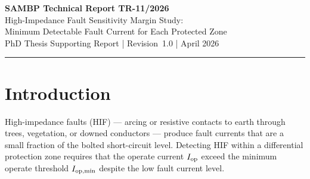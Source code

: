 \documentclass[12pt,a4paper]{article}
\newcommand{\SAMBP}{\textsc{sambp}}
\newcommand{\Iop}{I_{\rm op}}
\newcommand{\Iopmin}{I_{\rm op,min}}
\begin{document}
\begin{center}
  {\LARGE\bfseries\color{sambpblue}
    SAMBP Technical Report TR-11/2026}\\[6pt]
  {\large High-Impedance Fault Sensitivity Margin Study:\\
    Minimum Detectable Fault Current for Each Protected Zone}\\[10pt]
  {\normalsize PhD Thesis Supporting Report \quad|\quad
    Revision~1.0 \quad| April 2026}
\end{center}

\vspace{4pt}\hrule\vspace{8pt}

\begin{abstract}
\noindent
This report characterises the minimum detectable fault current for each
\SAMBP{} protected zone by sweeping a scale factor $\alpha \in
[1.00,\,0.05]$ on the nominal fault current and evaluating trip
probability over 200~trials per level.  Nine $\alpha$ levels are tested
across ten relay--scenario combinations.  The study reveals a fundamental
sensitivity--specificity trade-off inherent in the Stage-2 confidence
gate: bus differential (87B) and transformer differential (87T) zones
maintain TPR~=~1.000 down to $\alpha = 0.05$ ($I_f \geq 0.20$~pu), but
the line differential (87L) Stage-2 gate raises the effective detection
threshold to $I_f \approx 0.72$~pu (Phase-to-Ground) or 0.56~pu
(Three-phase) — 3--4$\times$ above the conventional relay's effective
threshold of 0.20--0.24~pu.  The over-current (OC) relay detection
margin follows the pickup threshold analytically.  These results quantify
the selectivity--sensitivity trade-off and provide zone-specific
detection margin tables for the thesis chapter synthesis.
\end{abstract}

\tableofcontents
\listoffigures
\listoftables
\newpage

\section{Introduction}

High-impedance faults (HIF) — arcing or resistive contacts to earth
through trees, vegetation, or downed conductors — produce fault currents
that are a small fraction of the bolted short-circuit level.  Detecting
HIF within a differential protection zone requires that the operate
current $\Iop$ exceed the minimum operate threshold $\Iopmin$ despite the
low fault current level.
\end{document}
